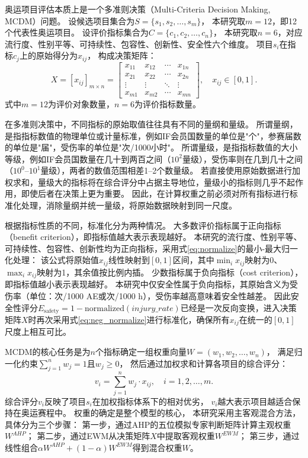 \documentclass[twoside]{CUGThesis}
\begin{document}
奥运项目评估本质上是一个多准则决策（Multi-Criteria Decision Making, MCDM）问题\cite{Hwang1981}。
设候选项目集合为$S = \{s_1, s_2, \ldots, s_m\}$，
本研究取$m = 12$，即12个代表性奥运项目。
设评价指标集合为$C = \{c_1, c_2, \ldots, c_n\}$，
本研究取$n = 6$，对应流行度、性别平等、可持续性、包容性、创新性、安全性六个维度。
项目$s_i$在指标$c_j$上的原始得分为$x_{ij}$，
构成决策矩阵：
\begin{equation}
X = [x_{ij}]_{m \times n} =
\begin{bmatrix}
x_{11} & x_{12} & \cdots & x_{1n} \\
x_{21} & x_{22} & \cdots & x_{2n} \\
\vdots & \vdots & \ddots & \vdots \\
x_{m1} & x_{m2} & \cdots & x_{mn}
\end{bmatrix}, \quad x_{ij} \in [0, 1].
\label{eq:decision_matrix}
\end{equation}
式中$m = 12$为评价对象数量，$n = 6$为评价指标数量。

在多准则决策中，不同指标的原始取值往往具有不同的量纲和量级\cite{Hwang1981}。
所谓量纲，是指指标数值的物理单位或计量标准，例如IF会员国数量的单位是"个"，参赛届数的单位是"届"，受伤率的单位是"次/1000小时"。
所谓量级，是指指标数值的大小等级，例如IF会员国数量在几十到两百之间（$10^2$量级），受伤率则在几到几十之间（$10^0$--$10^1$量级），两者的数值范围相差1--2个数量级。
若直接使用原始数据进行加权求和，量级大的指标将在综合评分中占据主导地位，量级小的指标则几乎不起作用，即使后者在决策上更为重要。
因此，在计算权重之前必须对所有指标进行标准化处理，消除量纲并统一量级，将原始数据映射到同一尺度\cite{Wang2019}。

根据指标性质的不同，标准化分为两种情况。
大多数评价指标属于正向指标（benefit criterion），即指标值越大表示表现越好\cite{Hwang1981}。
本研究的流行度、性别平等、可持续性、包容性、创新性均为正向指标，采用式\eqref{eq:normalize}的最小-最大归一化处理：
该公式将原始值$x_{ij}$线性映射到$[0,1]$区间，其中$\min_i x_{ij}$映射为0、$\max_i x_{ij}$映射为1，其余值按比例内插。
少数指标属于负向指标（cost criterion），即指标值越小表示表现越好。
本研究中仅安全性属于负向指标，其原始含义为受伤率（单位：次/1000 AE或次/1000 h），受伤率越高意味着安全性越差。
因此安全性评分$E_{\text{safety}} = 1 - \text{normalized}(injury\_rate)$已经是一次反向变换，进入决策矩阵$X$时再次采用式\eqref{eq:neg_normalize}进行标准化，确保所有$x_{ij}$在统一的$[0,1]$尺度上相互可比。

MCDM的核心任务是为$n$个指标确定一组权重向量$W = (w_1, w_2, \ldots, w_n)$，
满足归一化约束$\sum_{j=1}^n w_j = 1$且$w_j \ge 0$，
然后通过加权求和计算各项目的综合评分：
\begin{equation}
v_i = \sum_{j=1}^{n} w_j \cdot x_{ij}, \quad i = 1, 2, \ldots, m.
\label{eq:score}
\end{equation}
综合评分$v_i$反映了项目$s_i$在加权指标体系下的相对优劣，
$v_i$越大表示项目越适合保持在奥运赛程中。
权重的确定是整个模型的核心，
本研究采用主客观混合方法，具体分为三个步骤：
第一步，通过AHP的五位模拟专家判断矩阵计算主观权重$W^{AHP}$；
第二步，通过EWM从决策矩阵$X$中提取客观权重$W^{EWM}$；
第三步，通过线性组合$\alpha W^{AHP} + (1 - \alpha) W^{EWM}$得到混合权重$W$。
\end{document}
